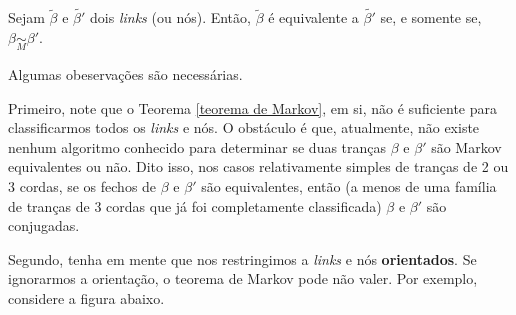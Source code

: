 	\begin{theorem}
		\label{teorema de Markov simplificado}
		Sejam $\widetilde{\beta}$ e $\widetilde{\beta'}$ dois \textit{links} (ou nós). Então, $\widetilde{\beta}$ é equivalente a $\widetilde{\beta'}$ se, e somente se, $\beta\underset{M}{\sim}\beta'$.
	\end{theorem}
	\par\vspace{0.3cm} Algumas obeservações são necessárias.
	\begin{remark}
		Primeiro, note que o Teorema \eqref{teorema de Markov}, em si, não é suficiente para classificarmos todos os \textit{links} e nós. O obstáculo é que, atualmente, não existe nenhum algoritmo conhecido para determinar se duas tranças $\beta$ e $\beta'$ são Markov equivalentes ou não. Dito isso, nos casos relativamente simples de tranças de 2 ou 3 cordas, se os fechos de $\beta$ e $\beta'$ são equivalentes, então (a menos de uma família de tranças de 3 cordas que já foi completamente classificada) $\beta$ e $\beta'$ são conjugadas.\cite{classificacao}
		\par\vspace{0.3cm} Segundo, tenha em mente que nos restringimos a \textit{links} e nós \textbf{orientados}. Se ignorarmos a orientação, o teorema de Markov pode não valer. Por exemplo, considere a figura abaixo.
		

\end{remark}
